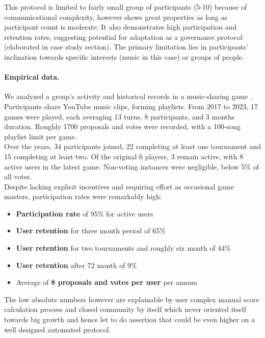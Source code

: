 \documentclass{article}
\begin{document}
\begin{CJK}{UTF8}{gbsn}
\begin{multicols}{2}
        This protocol is limited to fairly small group of participants (5-10) because of communicational complexity, however shows great properties as long as participant count is moderate.
        It also demonstrates high participation and retention rates, suggesting potential for adaptation as a governance protocol (elaborated in case study section). The primary limitation lies in participants' inclination towards specific interests (music in this case) or groups of people.


        \paragraph{Empirical data.} We analyzed a group's activity and historical records in a music-sharing game \cite{DariusYoutube}. Participants share YouTube music clips, forming playlists. From 2017 to 2023, 17 games were played, each averaging 13 turns, 8 participants, and 3 months duration. Roughly 1700 proposals and votes were recorded, with a 100-song playlist limit per game.\\
        Over the years, 34 participants joined, 22 completing at least one tournament and 15 completing at least two. Of the original 6 players, 3 remain active, with 8 active users in the latest game. Non-voting instances were negligible, below 5\% of all votes. \\
        Despite lacking explicit incentives and requiring effort as occasional game masters, participation rates were remarkably high:
        \begin{itemize}[nosep]
            \item \textbf{Participation rate} of 95\% for active users
            \item \textbf{User retention} for three month period of 65\%
            \item \textbf{User retention} for two tournaments and roughly six month of 44\%
            \item \textbf{User retention} after 72 month of 9\%
            \item Average of \textbf{8 proposals and votes per user} per annum
        \end{itemize}

        The low absolute numbers however are explainable by user complex manual score calculation process and closed community by itself which never oriented itself towards big growth and hence let to do assertion that could be even higher on a well designed automated protocol.


\end{multicols}
\end{CJK}
\end{document}
